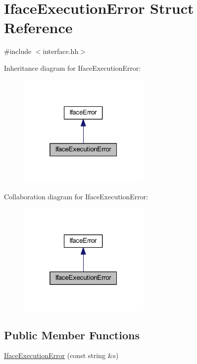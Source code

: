 \hypertarget{struct_iface_execution_error}{}\section{Iface\+Execution\+Error Struct Reference}
\label{struct_iface_execution_error}


{\ttfamily \#include $<$interface.\+hh$>$}



Inheritance diagram for Iface\+Execution\+Error\+:
\nopagebreak
\begin{figure}[H]
\begin{center}
\leavevmode
\includegraphics[width=181pt]{struct_iface_execution_error__inherit__graph}
\end{center}
\end{figure}


Collaboration diagram for Iface\+Execution\+Error\+:
\nopagebreak
\begin{figure}[H]
\begin{center}
\leavevmode
\includegraphics[width=181pt]{struct_iface_execution_error__coll__graph}
\end{center}
\end{figure}
\subsection*{Public Member Functions}
\begin{DoxyCompactItemize}
\item 
\mbox{\hyperlink{struct_iface_execution_error_a69ff3ef464f81b1cf0c3b4dc33b73ae7}{Iface\+Execution\+Error}} (const string \&s)
\end{DoxyCompactItemize}
